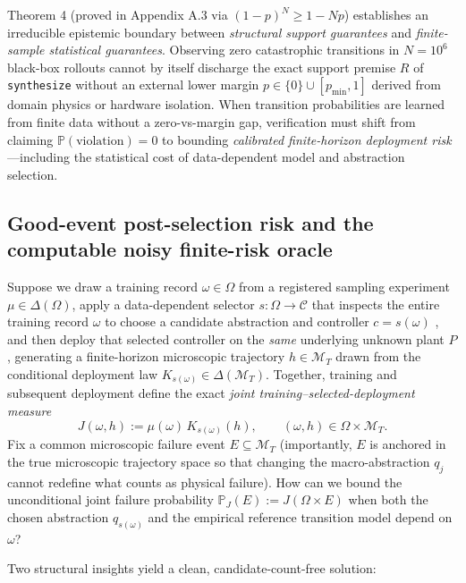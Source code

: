 \documentclass[11pt,a4paper]{article}
\begin{document}
Theorem 4 (proved in Appendix A.3 via \((1-p)^N \ge 1 - Np\))
establishes an irreducible epistemic boundary between \emph{structural
support guarantees} and \emph{finite-sample statistical guarantees}.
Observing zero catastrophic transitions in \(N = 10^6\) black-box
rollouts cannot by itself discharge the exact support premise \(R\) of
\texttt{synthesize} without an external lower margin
\(p \in \{0\} \cup [p_{\min}, 1]\) derived from domain physics or
hardware isolation. When transition probabilities are learned from
finite data without a zero-vs-margin gap, verification must shift from
claiming \(\mathbb{P}(\text{violation}) = 0\) to bounding
\emph{calibrated finite-horizon deployment risk}---including the
statistical cost of data-dependent model and abstraction selection.

\subsection{Good-event post-selection risk and the computable noisy
finite-risk
oracle}\label{good-event-post-selection-risk-and-the-computable-noisy-finite-risk-oracle}

Suppose we draw a training record \(\omega \in \Omega\) from a
registered sampling experiment \(\mu \in \Delta(\Omega)\), apply a
data-dependent selector \(s: \Omega \to \mathcal{C}\) that inspects the
entire training record \(\omega\) to choose a candidate abstraction and
controller \(c = s(\omega)\)
\citep{berk2013, kearnsSingh2002, strehl2009}, and then deploy that
selected controller on the \emph{same} underlying unknown plant \(P\),
generating a finite-horizon microscopic trajectory
\(h \in \mathcal{M}_T\) drawn from the conditional deployment law
\(K_{s(\omega)} \in \Delta(\mathcal{M}_T)\). Together, training and
subsequent deployment define the exact \emph{joint
training--selected-deployment measure}
\[J(\omega, h) := \mu(\omega)\, K_{s(\omega)}(h), \qquad (\omega, h) \in \Omega \times \mathcal{M}_T.\]
Fix a common microscopic failure event \(E \subseteq \mathcal{M}_T\)
(importantly, \(E\) is anchored in the true microscopic trajectory space
so that changing the macro-abstraction \(q_j\) cannot redefine what
counts as physical failure). How can we bound the unconditional joint
failure probability \(\mathbb{P}_J(E) := J(\Omega \times E)\) when both
the chosen abstraction \(q_{s(\omega)}\) and the empirical reference
transition model depend on \(\omega\)?

Two structural insights yield a clean, candidate-count-free solution:
\end{document}
